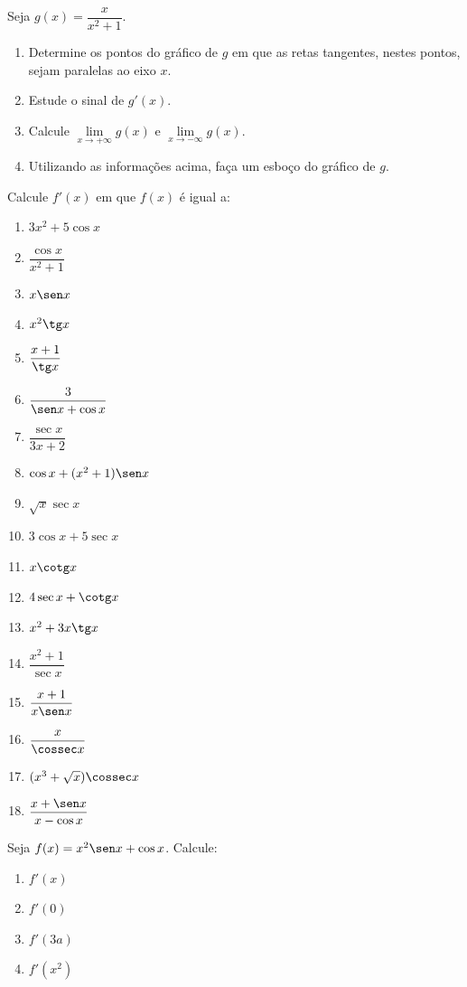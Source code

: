 \begin{exercicio}[8]
\label{ex:7.7.8}
Seja $g(x) = \dfrac{x}{x^2 + 1}$.
\begin{enumerate}[label=\alph*)]
    \item Determine os pontos do gráfico de $g$ em que as retas tangentes, nestes pontos, sejam paralelas ao eixo $x$.
    \item Estude o sinal de $g'(x)$.
    \item Calcule $\lim\limits_{x \to +\infty} g(x)$ e $\lim\limits_{x \to -\infty} g(x)$.
    \item Utilizando as informações acima, faça um esboço do gráfico de $g$.
\end{enumerate}
\end{exercicio}

\begin{exercicio}[9]
\label{ex:7.7.9}
Calcule $f'(x)$ em que $f(x)$ é igual a:
\begin{enumerate}[label=\alph*)]
    \item $3x^2 + 5\cos x$
    \item $\dfrac{\cos x}{x^2 + 1}$
    \item $x\sen x$
    \item $x^2 \tg x$
    \item $\dfrac{x + 1}{\tg x}$
    \item $\dfrac{3}{\sen x + \cos x}$
    \item $\dfrac{\sec x}{3x + 2}$
    \item $\cos x + (x^2 + 1)\sen x$
    \item $\sqrt{x}\sec x$
    \item $3\cos x + 5\sec x$
    \item $x\cotg x$
    \item $4\sec x + \cotg x$
    \item $x^2 + 3x\tg x$
    \item $\dfrac{x^2 + 1}{\sec x}$
    \item $\dfrac{x + 1}{x\sen x}$
    \item $\dfrac{x}{\cossec x}$
    \item $(x^3 + \sqrt{x})\cossec x$
    \item $\dfrac{x + \sen x}{x - \cos x}$
\end{enumerate}
\end{exercicio}

\begin{exercicio}[10]
\label{ex:7.7.10}
Seja $f(x) = x^2 \sen x + \cos x$. Calcule:
\begin{enumerate}[label=\alph*)]
    \item $f'(x)$
    \item $f'(0)$
    \item $f'(3a)$
    \item $f'(x^2)$
\end{enumerate}
\end{exercicio}

